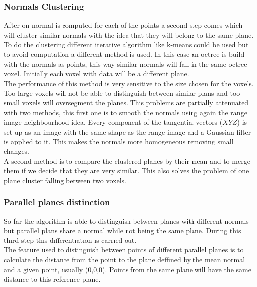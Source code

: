 \documentclass[fontsize=12pt]{article}
\begin{document}
\subsubsection{Normals Clustering}

After on normal is computed for each of the points a second step comes which will cluster similar normals with the idea that they will belong to the same plane. To do the clustering different iterative algorithm like k-means could be used but to avoid computation a different method is used. In this case an octree is build with the normals as points, this way similar normals will fall in the same octree voxel. Initially each voxel with data will be a different plane.\\

The performance of this method is very sensitive to the size chosen for the voxels. Too large voxels will not be able to distinguish between similar plans and too small voxels will oversegment the planes. This problems are partially attenuated with two methods, this first one is to smooth the normals using again the range image neighbourhood idea. Every component of the tangential vectors ($XYZ$) is set up as an image with the same shape as the range image and a Gaussian filter is applied to it. This makes the normals more homogeneous removing small changes.\\

A second method is to compare the clustered planes by their mean and to merge them if we decide that they are very similar. This also solves the problem of one plane cluster falling between two voxels.\\ 

\subsubsection{Parallel planes distinction}

So far the algorithm is  able to distinguish between planes with different normals but parallel plans share a normal while not being the same plane. During this third step this differentiation is carried out.\\


The feature used to distinguish between points of different parallel planes is to calculate the distance from the point to the plane deffined by the mean normal and a given point, usually (0,0,0). Points from the same plane will have the same distance to this reference plane.\\
\end{document}
